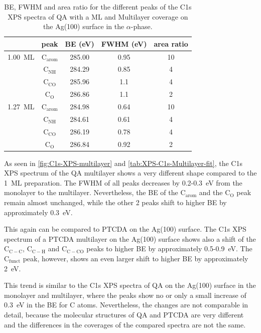 \begin{table}[H]
	\centering
	\caption{\Ac{BE}, \ac{FWHM} and area ratio for the different peaks of the C1s \ac{XPS} spectra of \ac{QA} with a \ac{ML} and Multilayer coverage on the Ag(100) surface in the $\alpha$-phase.}
	\begin{tabular}{@{}ccccc@{}} \toprule
		 & peak & \ac{BE} (eV) & \ac{FWHM} (eV) & area ratio \\
		\midrule
		1.00~\ac{ML} & $\mathrm{C_{arom}}$ & 285.00 & 0.95 & 10 \\
		& $\mathrm{C_{NH}}$ & 284.29 & 0.85 & 4 \\
		& $\mathrm{C_{CO}}$ & 285.96 & 1.1 & 4 \\ 
		& $\mathrm{C_{O}}$ & 286.86 & 1.1 & 2 \\
        \midrule
		1.27~\ac{ML} & $\mathrm{C_{arom}}$ & 284.98 & 0.64 & 10 \\
		& $\mathrm{C_{NH}}$ & 284.61 & 0.61 & 4 \\
		& $\mathrm{C_{CO}}$ & 286.19 & 0.78 & 4 \\ 
		& $\mathrm{C_{O}}$ & 286.84 & 0.92 & 2 \\
		\bottomrule
	\end{tabular}
	\label{tab:XPS-C1s-Multilayer-fit}
\end{table}

As seen in \autoref{fig:C1s-XPS-multilayer} and \autoref{tab:XPS-C1s-Multilayer-fit}, the C1s \ac{XPS} spectrum of the \ac{QA} multilayer shows a very different shape compared to the 1~\ac{ML} preparation. The \ac{FWHM} of all peaks decreases by 0.2-0.3~\si{eV} from the monolayer to the multilayer. Nevertheless, the \ac{BE} of the $\mathrm{C_{arom}}$ and the $\mathrm{C_{O}}$ peak remain almost unchanged, while the other 2 peaks shift to higher \ac{BE} by approximately 0.3~\si{eV}.

This again can be compared to \ac{PTCDA} on the Ag(100) surface. The C1s \ac{XPS} spectrum of a \ac{PTCDA} multilayer on the Ag(100) surface shows also a shift of the $\mathrm{C_{C-C}}$, $\mathrm{C_{C-H}}$ and $\mathrm{C_{C-CO}}$ peaks to higher \ac{BE} by approximately 0.5-0.9~\si{eV}. The $\mathrm{C_{funct}}$ peak, however, shows an even larger shift to higher \ac{BE} by approximately 2~\si{eV}.\autocite{Bauer2014}

This trend is similar to the C1s \ac{XPS} spectra of \ac{QA} on the Ag(100) surface in the monolayer and multilayer, where the peaks show no or only a small increase of 0.3~\si{eV} in the \ac{BE} for C atoms. Nevertheless, the changes are not comparable in detail, because the molecular structures of \ac{QA} and \ac{PTCDA} are very different and the differences in the coverages of the compared spectra are not the same.


